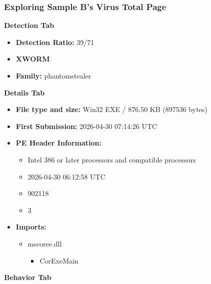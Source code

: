 \documentclass[10pt]{article}
\begin{document}
\subsubsection{Exploring Sample B's Virus Total Page}
\textbf{Detection Tab}
\begin{itemize}
	\item \textbf{Detection Ratio:} 39/71
	\item \textbf{XWORM}
	\item \textbf{Family:} phantomstealer
\end{itemize}
\textbf{Details Tab}
\begin{itemize}
	\item \textbf{File type and size:} Win32 EXE / 876.50 KB (897536 bytes)
	\item \textbf{First Submission:} 2026-04-30 07:14:26 UTC
	\item \textbf{PE Header Information:}
	\begin{itemize}
		\item {} Intel 386 or later processors and compatible processors
		\item {} 2026-04-30 06:12:58 UTC
		\item {} 902118
		\item {} 3
	\end{itemize} 
	\item \textbf{Imports:}
	\begin{itemize}
		\item mscoree.dll
		\begin{itemize}
			\item \underbar{   }CorExeMain
		\end{itemize}
	\end{itemize}
\end{itemize}
\textbf{Behavior Tab}
\end{document}
